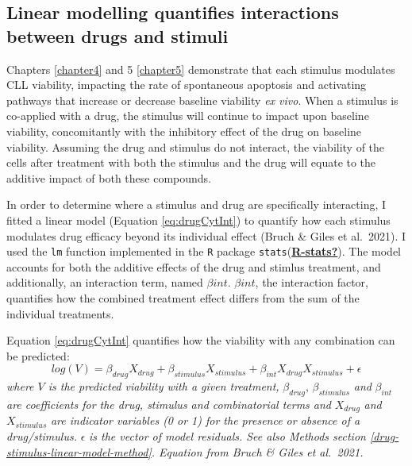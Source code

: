 \documentclass[11pt, a4paper, twosided]{book}
\begin{document}
\hypertarget{drug-stimulus-linear-model}{%
\subsection{Linear modelling quantifies interactions between drugs and stimuli}\label{drug-stimulus-linear-model}}

Chapters \ref{chapter4} and 5 \ref{chapter5} demonstrate that each stimulus modulates CLL viability, impacting the rate of spontaneous apoptosis and activating pathways that increase or decrease baseline viability \emph{ex vivo}. When a stimulus is co-applied with a drug, the stimulus will continue to impact upon baseline viability, concomitantly with the inhibitory effect of the drug on baseline viability. Assuming the drug and stimulus do not interact, the viability of the cells after treatment with both the stimulus and the drug will equate to the additive impact of both these compounds.

In order to determine where a stimulus and drug are specifically interacting, I fitted a linear model (Equation \eqref{eq:drugCytInt}) to quantify how each stimulus modulates drug efficacy beyond its individual effect (Bruch \& Giles et al.~2021). I used the \texttt{lm} function implemented in the \texttt{R} package \texttt{stats}(\protect\hyperlink{ref-R-stats}{\textbf{R-stats?}}). The model accounts for both the additive effects of the drug and stimlus treatment, and additionally, an interaction term, named \(\beta{int}\). \(\beta{int}\), the interaction factor, quantifies how the combined treatment effect differs from the sum of the individual treatments.

Equation \eqref{eq:drugCytInt} quantifies how the viability with any combination can be predicted:
\begin{equation}
            log(V) = \beta_{drug}X_{drug} + \beta_{stimulus}X_{stimulus} + \beta_{int}X_{drug}X_{stimulus} + \epsilon
                                       \label{eq:drugCytInt}
    \end{equation}
\emph{where \(V\) is the predicted viability with a given treatment,} \(\beta_{drug}\), \(\beta_{stimulus}\) \emph{and} \(\beta_{int}\) \emph{are coefficients for the drug, stimulus and combinatorial terms and} \(X_{drug}\) \emph{and} \(X_{stimulus}\) \emph{are indicator variables (0 or 1) for the presence or absence of a drug/stimulus.} \(\epsilon\) \emph{is the vector of model residuals. See also Methods section \ref{drug-stimulus-linear-model-method}. Equation from Bruch \& Giles et al.~2021.}
\end{document}

